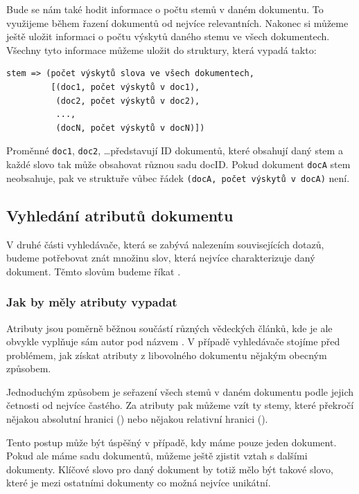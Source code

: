 \documentclass[12pt]{article}
\newcommand{\code}[1]{\texttt{#1}}
\begin{document}
Bude se nám také hodit informace o počtu stemů v daném dokumentu. To využijeme během řazení dokumentů od nejvíce relevantních. Nakonec si můžeme ještě uložit informaci o počtu výskytů daného stemu ve všech dokumentech. Všechny tyto informace můžeme uložit do struktury, která vypadá takto: 

\begin{verbatim}
stem => (počet výskytů slova ve všech dokumentech, 
         [(doc1, počet výskytů v doc1), 
          (doc2, počet výskytů v doc2), 
          ..., 
          (docN, počet výskytů v docN)])
\end{verbatim}

Proměnné \code{doc1}, \code{doc2}, \dots představují ID dokumentů, které obsahují daný stem a každé slovo tak může obsahovat různou sadu docID. Pokud dokument \code{docA} stem neobsahuje, pak ve struktuře vůbec řádek \code{(docA, počet výskytů v docA)} není. 

\subsection{Vyhledání atributů dokumentu} 

V druhé části vyhledávače, která se zabývá nalezením souvisejících dotazů, budeme potřebovat znát množinu slov, která nejvíce charakterizuje daný dokument. Těmto slovům budeme říkat . 

\subsubsection{Jak by měly atributy vypadat}

Atributy jsou poměrně běžnou součástí různých vědeckých článků, kde je ale obvykle vyplňuje sám autor pod názvem . V případě vyhledávače stojíme před problémem, jak získat atributy z libovolného dokumentu nějakým obecným způsobem. 

Jednoduchým způsobem je seřazení všech stemů v daném dokumentu podle jejich četnosti od nejvíce častého. Za atributy pak můžeme vzít ty stemy, které překročí nějakou absolutní hranici () nebo nějakou relativní hranici (). 

Tento postup může být úspěšný v případě, kdy máme pouze jeden dokument. Pokud ale máme sadu dokumentů, můžeme ještě zjistit vztah s dalšími dokumenty. Klíčové slovo pro daný dokument by totiž mělo být takové slovo, které je mezi ostatními dokumenty co možná nejvíce unikátní. 
\end{document}
